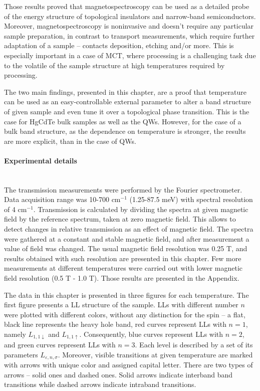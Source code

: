 \documentclass[titlepage,a4paper]{book}
\newcommand{\wciecie}{\quad\phantom{v}}
\newcommand{\myparagraph}[1]{\paragraph{#1}\mbox{}\\}
\begin{document}
Those results proved that magnetospectroscopy can be used as a detailed probe of the energy structure of topological insulators and narrow-band semiconductors. Moreover, magnetospectroscopy is noninvasive and doesn't require any particular sample preparation, in contrast to transport measurements, which require further adaptation of a sample -- contacts deposition, etching and/or more. This is especially important in a case of MCT, where processing is a challenging task due to the volatile of the sample structure at high temperatures required by processing.

The two main findings, presented in this chapter, are a proof that temperature can be used as an easy-controllable external parameter to alter a band structure of given sample and even tune it over a topological phase transition. This is the case for HgCdTe bulk samples as well as the QWs. However, for the case of a bulk band structure, as the dependence on temperature is stronger, the results are more explicit, than in the case of QWs. 

\myparagraph{Experimental details}
\wciecie
The transmission measurements were performed by the Fourier spectrometer. Data acquisition range was 10-700 cm$^{-1}$ (1.25-87.5 meV) with spectral resolution of 4 cm$^{-1}$. Transmission is calculated by dividing the spectra at given magnetic field by the reference spectrum, taken at zero magnetic field. This allows to detect changes in relative transmission as an effect of magnetic field. The spectra were gathered at a constant and stable magnetic field, and after measurement a value of field was changed. The usual magnetic field resolution was 0.25 T, and results obtained with such resolution are presented in this chapter. Few more measurements at different temperatures were carried out with lower magnetic field resolution (0.5 T - 1.0 T). Those results are presented in the Appendix.

The data in this chapter is presented in three figures for each temperature. The first figure presents a LL structure of the sample. LLs with different number $n$ were plotted with different colors, without any distinction for the spin --  a flat, black line represents the heavy hole band, red curves represent LLs with $n = 1$, namely $L_{1,1\downarrow}$ and $L_{1,1\uparrow}$. Consequently, blue curves represent LLs with $n = 2$, and green curves represent LLs with $n = 3$. Each level is described by a set of its parameters $L_{\varepsilon,n,\sigma}$. Moreover, visible transitions at given temperature are marked with arrows with unique color and assigned capital letter.
There are two types of arrows -- solid ones and dashed ones. Solid arrows indicate interband band transitions while dashed arrows indicate intraband transitions. 
\end{document}

